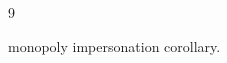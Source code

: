 \documentclass[11pt]{article}
\theoremstyle{definition}
\begin{document}
\begin{thebibliography}{9}
\begin{itemize}
    monopoly impersonation corollary.





\end{itemize}











































































\end{thebibliography}
\end{document}
